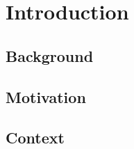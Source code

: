 \section{Introduction} \label{sec:Intro}

  \subsection{Background} \label{ssec:background}

    \blindtext

  \subsection{Motivation} \label{ssec:motivation}

    \blindtext


  \subsection{Context} \label{ssec:context}

    \blindtext
